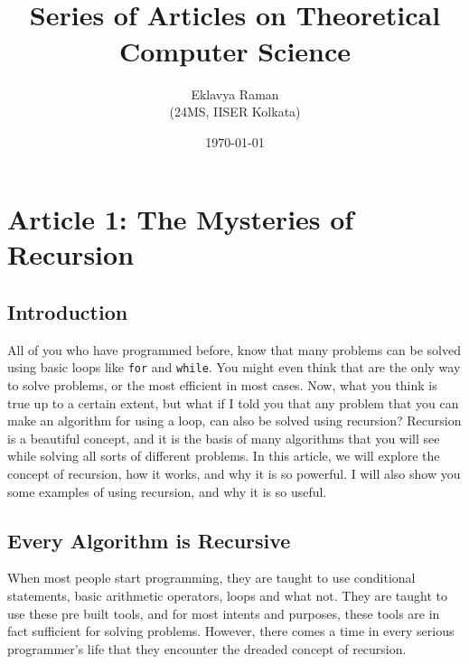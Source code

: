\documentclass[openany]{book}
\begin{document}
\title{\Large{} \\ \vspace{5pt}
\large{Series of Articles on Theoretical Computer Science}}
\author{Eklavya Raman \\ \vspace{5pt} (24MS, IISER Kolkata)} 
\date{\today}
\maketitle
\tableofcontents
\chapter{Article 1: The Mysteries of Recursion}
\section{Introduction}
All of you who have programmed before, know that many problems can be solved using basic loops like \texttt{for} and \texttt{while}. You might even think that are the only way to solve problems, or the most efficient in most cases. Now, what you think is true up to a certain extent, but what if I told you that any problem that you can make an algorithm for using a loop, can also be solved using recursion? Recursion is a beautiful concept, and it is the basis of many algorithms that you will see while solving all sorts of different problems. In this article, we will explore the concept of recursion, how it works, and why it is so powerful. I will also show you some examples of using recursion, and why it is so useful. 
\section{Every Algorithm is Recursive}
When most people start programming, they are taught to use conditional statements, basic arithmetic operators, loops and what not. They are taught to use these pre built tools, and for most intents and purposes, these tools are in fact sufficient for solving problems. However, there comes a time in every serious programmer's life that they encounter the dreaded concept of recursion.
\end{document}

